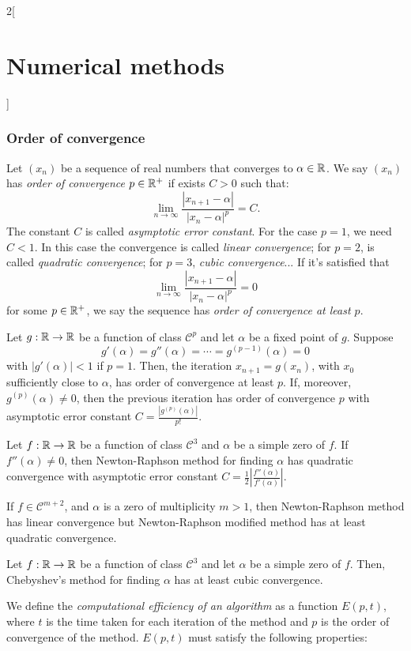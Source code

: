\documentclass[../../../main.tex]{subfiles}
\begin{document}
\begin{multicols}{2}[\section{Numerical methods}]
\subsubsection*{Order of convergence}
\begin{definition}
    Let $(x_n)$ be a sequence of real numbers that converges to $\alpha\in\mathbb{R}$. We say $(x_n)$ has \textit{order of convergence $p\in\mathbb{R}^+$} if exists $C>0$ such that: $$\lim_{n\to\infty}\frac{|x_{n+1}-\alpha|}{|x_n-\alpha|^p}=C.$$ The constant $C$ is called \textit{asymptotic error constant}. For the case $p=1$, we need $C<1$. In this case the convergence is called \textit{linear convergence}; for $p=2$, is called \textit{quadratic convergence}; for $p=3$, \textit{cubic convergence}... If it's satisfied that $$\lim_{n\to\infty}\frac{|x_{n+1}-\alpha|}{|x_n-\alpha|^p}=0$$ for some $p\in\mathbb{R}^+$, we say the sequence has \textit{order of convergence at least $p$}.
\end{definition}
\begin{theorem}
    Let $g:\mathbb{R}\rightarrow\mathbb{R}$ be a function of class $\mathcal{C}^p$ and let $\alpha$ be a fixed point of $g$. Suppose $$g'(\alpha)=g''(\alpha)=\cdots=g^{(p-1)}(\alpha)=0$$ with $|g'(\alpha)|<1$ if $p=1$. Then, the iteration $x_{n+1}=g(x_n)$, with $x_0$ sufficiently close to $\alpha$, has order of convergence at least $p$. If, moreover, $g^{(p)}(\alpha)\ne0$, then the previous iteration has order of convergence $p$ with asymptotic error constant $C=\frac{|g^{(p)}(\alpha)|}{p!}$.
\end{theorem}
\begin{theorem}
    Let $f:\mathbb{R}\rightarrow\mathbb{R}$ be a function of class $\mathcal{C}^3$ and $\alpha$ be a simple zero of $f$. If $f''(\alpha)\ne0$, then Newton-Raphson method for finding $\alpha$ has quadratic convergence with asymptotic error constant $C=\frac{1}{2}\left|\frac{f''(\alpha)}{f'(\alpha)}\right|$.\par If $f\in\mathcal{C}^{m+2}$, and $\alpha$ is a zero of multiplicity $m>1$, then Newton-Raphson method has linear convergence but Newton-Raphson modified method has at least quadratic convergence.
\end{theorem}
\begin{theorem}
    Let $f:\mathbb{R}\rightarrow\mathbb{R}$ be a function of class $\mathcal{C}^3$ and let $\alpha$ be a simple zero of $f$. Then, Chebyshev's method for finding $\alpha$ has at least cubic convergence.
\end{theorem}
\begin{definition}
    We define the \textit{computational efficiency of an algorithm} as a function $E(p,t)$, where $t$ is the time taken for each iteration of the method and $p$ is the order of convergence of the method. $E(p,t)$ must satisfy the following properties:

\end{definition}
\end{multicols}
\end{document}
